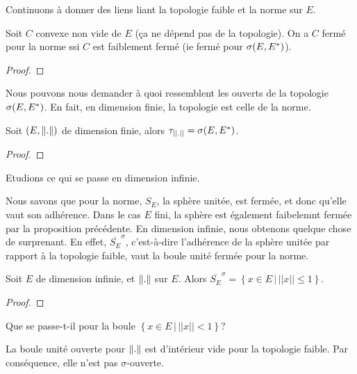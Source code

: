 Continuons à donner des liens liant la topologie faible et la norme sur $E$.

\begin{proposition}
	Soit $C$ convexe non vide de $E$ (ça ne dépend pas de la topologie).
	On a $C$ fermé pour la norme ssi $C$ est faiblement fermé (ie fermé pour
	$\sigma(E, E^{*})$).
\end{proposition}

\begin{proof}

\end{proof}

Nous pouvons nous demander à quoi ressemblent les ouverts de la topologie
$\sigma(E, E^{*})$. En fait, en dimension finie, la topologie est celle de la norme.

\begin{proposition}
	Soit $(E, \norm{.})$ de dimension finie, alors $\tau_{||.||}
	= \sigma(E, E^{*})$.
\end{proposition}

\begin{proof}

\end{proof}

Etudions ce qui se passe en dimension infinie.

Nous savons que pour la norme, $S_{E}$, la sphère unitée, est fermée, et donc
qu'elle vaut son adhérence.  Dans le cas $E$ fini, la sphère est également
faibelemnt fermée par la proposition précédente. En dimension infinie, nous
obtenons quelque chose de surprenant. En effet, $\overline{S_{E}}^{\sigma}$,
c'est-à-dire l'adhérence de la sphère unitée par rapport à la topologie faible,
vaut la boule unité fermée pour la norme.

\begin{proposition}
	Soit $E$ de dimension infinie, et $\norm{.}$ sur $E$. Alors
	$\overline{S_{E}}^{\sigma} = \left\{ x \in E \, | \, ||x|| \leq 1 \right\}$.
\end{proposition}

\begin{proof}

\end{proof}

Que se passe-t-il pour la boule $\left\{ x \in E \, | \, ||x|| < 1 \right\}$?

\begin{proposition}
	La boule unité ouverte pour $\norm{.}$ est d'intérieur vide pour la
	topologie faible. Par conséquence, elle n'est pas $\sigma$-ouverte.
\end{proposition}

